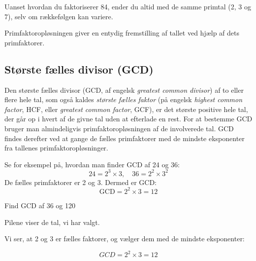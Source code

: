 Uanset hvordan du faktoriserer 84, ender du altid med de samme primtal (2, 3 og 7), selv om rækkefølgen kan variere.

Primfaktoropløsningen giver en entydig fremstilling af tallet ved hjælp af dets primfaktorer.

\subsection*{Største fælles divisor (GCD)}
Den største fælles divisor (GCD, af engelsk \emph{greatest common divisor}) af to eller flere hele tal, som også kaldes \textit{største fælles faktor} (på engelsk \textit{highest common factor}, HCF, eller \textit{greatest common factor}, GCF), er det største positive hele tal, der går op i hvert af de givne tal uden at efterlade en rest. For at bestemme GCD bruger man almindeligvis primfaktoropløsningen af de involverede tal. GCD findes derefter ved at gange de fælles primfaktorer med de mindste eksponenter fra tallenes primfaktoropløsninger.

Se for eksempel på, hvordan man finder GCD af 24 og 36:
\[
24 = 2^3 \times 3, \quad 36 = 2^2 \times 3^2
\]
De fælles primfaktorer er 2 og 3. Dermed er GCD:
\[
\text{GCD} = 2^2 \times 3 = 12
\]

\begin{example} Find GCD af 36 og 120

\begin{solution}
    

Pilene viser de tal, vi har valgt.


Vi ser, at 2 og 3 er fælles faktorer, og vælger dem med de mindste eksponenter:

\[
GCD = 2^2\times 3 = 12
\]
\end{solution}

\end{example}
 
